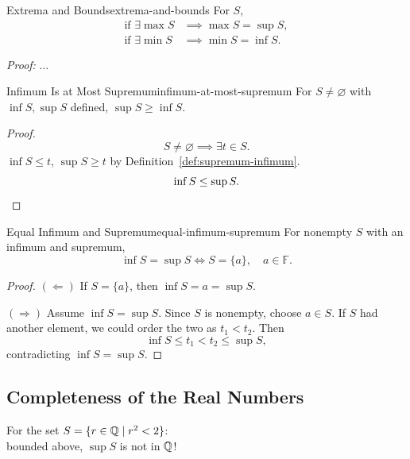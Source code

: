 \begin{theorem}{Extrema and Bounds}{extrema-and-bounds}
  For $S$,
  \begin{align*}
    \text{if }\exists\max S & \implies\max S=\sup S, \\
    \text{if }\exists\min S & \implies\min S=\inf S.
  \end{align*}
\end{theorem}

\textit{Proof:} $\ldots$

\begin{samepage}
  \begin{theorem}{Infimum Is at Most Supremum}{infimum-at-most-supremum}
    For $S\ne\varnothing$ with $\inf S,\sup S$ defined, $\sup S\ge\inf S$.
  \end{theorem}

  \begin{proof}
    \[
      S\ne\varnothing\implies\exists t\in S.
    \]
    $\inf S\le t$, $\sup S\ge t$ by Definition~\ref{def:supremum-infimum}.
    \[
      \inf S\le\sup S.\qedhere
    \]
  \end{proof}
\end{samepage}

\begin{theorem}{Equal Infimum and Supremum}{equal-infimum-supremum}
  For nonempty $S$ with an infimum and supremum,
  \[
    \inf S=\sup S\iff S=\{a\},\quad a\in\mathbb{F}.
  \]
\end{theorem}

\begin{proof}
  $(\Leftarrow)$ If $S=\{a\}$, then $\inf S=a=\sup S$.

  $(\Rightarrow)$ Assume $\inf S=\sup S$. Since $S$ is nonempty, choose $a\in S$.
  If $S$ had another element, we could order the two as $t_1<t_2$. Then
  \[
    \inf S\le t_1<t_2\le\sup S,
  \]
  contradicting $\inf S=\sup S$.
\end{proof}

\subsection{Completeness of the Real Numbers}

\begin{example}
  For the set $S=\{r\in\mathbb{Q}\mid r^2<2\}$:\\
  bounded above, $\sup S$ is not in $\mathbb{Q}$!
\end{example}

